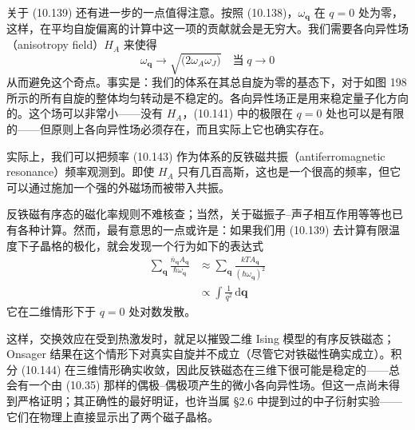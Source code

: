 关于 (10.139) 还有进一步的一点值得注意。按照 (10.138)，$\omega_{\mathbf{q}}$ 在 $q = 0$ 处为零，这样，在平均自旋偏离的计算中这一项的贡献就会是无穷大。我们需要各向异性场（anisotropy field）$H_A$ 来使得
\begin{equation*}
\omega_{\mathbf{q}} \to \sqrt{\bigl( 2\omega_A\omega_J \bigr)} \quad \text{当}\; q \to 0 \tag{10.143}
\end{equation*}
从而避免这个奇点。事实是：我们的体系在其总自旋为零的基态下，对于如图 198 所示的所有自旋的整体均匀转动是不稳定的。各向异性场正是用来稳定量子化方向的。这个场可以非常小——没有 $H_A$，(10.141) 中的极限在 $q = 0$ 处也可以是有限的——但原则上各向异性场必须存在，而且实际上它也确实存在。

实际上，我们可以把频率 (10.143) 作为体系的反铁磁共振（antiferromagnetic resonance）频率观测到。即使 $H_A$ 只有几百高斯，这也是一个很高的频率，但它可以通过施加一个强的外磁场而被带入共振。

反铁磁有序态的磁化率规则不难核查；当然，关于磁振子–声子相互作用等等也已有各种计算。然而，最有意思的一点或许是：如果我们用 (10.139) 去计算有限温度下子晶格的极化，就会发现一个行为如下的表达式
\begin{align*}
\sum_{\mathbf{q}} \frac{\bar{n}_{\mathbf{q}} A_{\mathbf{q}}}{\hbar\omega_{\mathbf{q}}} &\approx \sum_{\mathbf{q}} \frac{kTA_{\mathbf{q}}}{(\hbar\omega_{\mathbf{q}})^2} \\
&\propto \int \frac{1}{q^2}\,\mathrm{d}\mathbf{q} \tag{10.144}
\end{align*}
它在二维情形下于 $q = 0$ 处对数发散。

这样，交换效应在受到热激发时，就足以摧毁二维 Ising 模型的有序反铁磁态；Onsager 结果在这个情形下对真实自旋并不成立（尽管它对铁磁性确实成立）。积分 (10.144) 在三维情形确实收敛，因此反铁磁态在三维下很可能是稳定的——总会有一个由 (10.35) 那样的偶极–偶极项产生的微小各向异性场。但这一点尚未得到严格证明；其正确性的最好明证，也许当属 §2.6 中提到过的中子衍射实验——它们在物理上直接显示出了两个磁子晶格。
